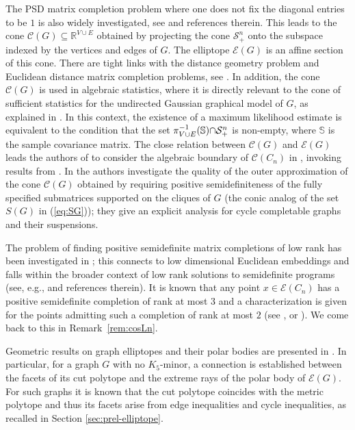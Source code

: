 \documentclass[a4paper, 11pt, twoside]{article}
\newcommand{\R}{\mathbb{R}}
\newcommand{\ME}{{\mathcal E}}
\newcommand{\MS}{{\mathcal S}}
\newcommand{\MCscr}{{\mathscr {C}}}
\theoremstyle{plain}
\begin{document}
The PSD matrix completion problem where one does not fix the diagonal entries to be $1$ is also widely investigated, see   \cite{GJSW_1984,Laurent_2001} and references therein.
This  leads to   the cone
 $\MCscr(G)\subseteq \R^{V\cup E}$ obtained by projecting the cone $\MS^n_+$ onto the subspace indexed by the vertices and edges of $G$. The elliptope $\ME(G)$ is an affine section of this cone.
There are tight links with the distance geometry problem and Euclidean distance matrix completion problems, see \cite{Laurent_1998,Laurent_2001}. 
In addition, the cone $\MCscr(G)$ is used in algebraic statistics, where  it is directly relevant to the cone of sufficient statistics for the undirected Gaussian graphical model of $G$, as explained in  \cite{Sturmfels2010MultivariateGaussians}. 
In this context, the existence of a maximum likelihood estimate is equivalent to the condition that the set $\pi_{V \cup E}^{-1}(\mathbb{S}) {\cap} {\cal S}^n_{+}$ is non-empty, where $\mathbb{S}$ is the sample covariance matrix. The close relation between $\MCscr (G)$ and $\ME(G)$ leads the authors of \cite{Sturmfels2010MultivariateGaussians} to consider the algebraic boundary of $\MCscr(C_n)$ in \cite[Section 4.2]{Sturmfels2010MultivariateGaussians}, invoking results from \cite{Barrett1993realpositivedefinite}.
In \cite{BS-2020} the authors investigate the quality of the outer approximation of the cone $\MCscr(G)$ obtained by requiring positive semidefiniteness of the fully specified submatrices supported on the cliques of $G$ (the conic analog of the set $S(G)$ in (\ref{eq:SG})); they give an explicit analysis for cycle completable graphs and their suspensions.

The problem of finding positive semidefinite matrix completions of low rank has been investigated in \cite{NLV-Fields,NLV-JCTB,LV-MP-2014}; this connects to low dimensional Euclidean embeddings \cite{Belk,Belk-Connelly} and falls within the broader context of low rank solutions to semidefinite programs (see, e.g., \cite{Pataki} and references therein). 
It is known that any point $x\in \ME(C_n)$ has a positive semidefinite completion of rank at most 3 and a characterization is given for the points admitting such a completion of rank at most $2$ (see \cite[Section 2.2]{NLV-Fields}, or \cite[Lemma 4.6]{BS-2020}). We come back to this  in Remark~\ref{rem:cosLn}.

Geometric results on graph elliptopes and their polar bodies are presented in \cite{Solus-Uhler-Yoshida}.
In particular, for a graph $G$ with no $K_5$-minor, a connection is established between the facets of its cut polytope and the extreme rays of the polar body of $\ME(G)$. For such graphs it is known that the cut polytope coincides with the metric polytope and thus its facets arise from edge inequalities and cycle inequalities, as recalled in Section \ref{sec:prel-elliptope}.
\end{document}

